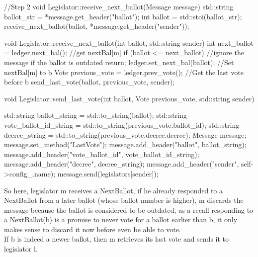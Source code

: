 \documentclass{article}
\begin{document}
\begin{code}
//Step 2
void Legislator::receive_next_ballot(Message message)
{
    std::string ballot_str = *message.get_header("ballot");
    int ballot = std::stoi(ballot_str);
    receive_next_ballot(ballot, *message.get_header("sender"));
}

void Legislator::receive_next_ballot(int ballot, std::string sender)
{
    int next_ballot = ledger.next_bal(); //get nextBal[m]
    if (ballot <= next_ballot) //ignore the message if the ballot is outdated
        return;
    ledger.set_next_bal(ballot); //Set nextBal[m] to b
    Vote previous_vote = ledger.prev_vote(); //Get the last vote before b
    send_last_vote(ballot, previous_vote, sender);
}

void Legislator::send_last_vote(int ballot, Vote previous_vote,
        std::string sender)
{
    std::string ballot_string = std::to_string(ballot);
    std::string vote_ballot_id_string
        = std::to_string(previous_vote.ballot_id);
    std::string decree_string = std::to_string(previous_vote.decree.decree);
    Message message;
    message.set_method("LastVote");
    message.add_header("ballot", ballot_string);
    message.add_header("vote_ballot_id", vote_ballot_id_string);
    message.add_header("decree", decree_string);
    message.add_header("sender", self->config_.name);
    message.send(legislators[sender]);

}
\end{code}
So here, legislator m receives a NextBallot, if he already responded to a NextBallot from a later ballot (whose ballot number is higher), m discards the message because the ballot is considered to be outdated, as a recall responding to a NextBallot(b) is a promise to never vote for a ballot earlier than b, it only makes sense to discard it now before even be able to vote.\\
If b is indeed a newer ballot, then m retrieves its last vote and sends it to legislator l.

\pagebreak
\end{document}
